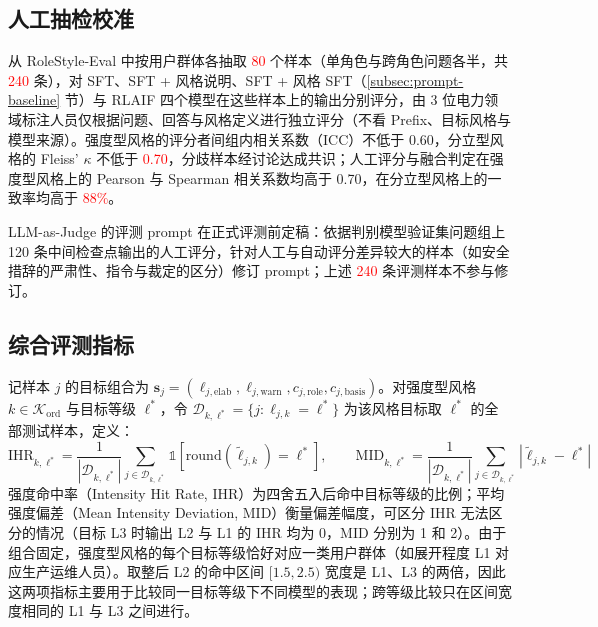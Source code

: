 \documentclass[fontset=fandol,type=master,campus=shenzhen,etitleauto=true]{hithesisbook}
\newcommand{\rev}[1]{\textcolor{red}{#1}}
\begin{document}
\subsection{人工抽检校准}\label{ux4ebaux5de5ux62bdux68c0ux6821ux51c6}

从 RoleStyle-Eval 中按用户群体各抽取 \rev{80} 个样本（单角色与跨角色问题各半，共 \rev{240} 条），对 SFT、SFT + 风格说明、SFT + 风格 SFT（\ref{subsec:prompt-baseline} 节）与 RLAIF 四个模型在这些样本上的输出分别评分，由 3 位电力领域标注人员仅根据问题、回答与风格定义进行独立评分（不看 Prefix、目标风格与模型来源）。强度型风格的评分者间组内相关系数（ICC）\cite{ref76}不低于 0.60，分立型风格的 Fleiss' $\kappa$ 不低于 \rev{0.70}，分歧样本经讨论达成共识；人工评分与融合判定在强度型风格上的 Pearson 与 Spearman 相关系数均高于 0.70，在分立型风格上的一致率均高于 \rev{88\%}。

LLM-as-Judge 的评测 prompt 在正式评测前定稿：依据判别模型验证集问题组上 120 条中间检查点输出的人工评分，针对人工与自动评分差异较大的样本（如安全措辞的严肃性、指令与裁定的区分）修订 prompt；上述 \rev{240} 条评测样本不参与修订。

\subsection{综合评测指标}\label{ux7efcux5408ux8bc4ux6d4bux6307ux6807}

记样本 $j$ 的目标组合为 $\mathbf{s}_j = (\ell_{j,\text{elab}}, \ell_{j,\text{warn}}, c_{j,\text{role}}, c_{j,\text{basis}})$。对强度型风格 $k \in \mathcal{K}_{\text{ord}}$ 与目标等级 $\ell^*$，令 $\mathcal{D}_{k,\ell^*} = \{ j : \ell_{j,k} = \ell^* \}$ 为该风格目标取 $\ell^*$ 的全部测试样本，定义：
\begin{equation}
\text{IHR}_{k,\ell^*} = \frac{1}{|\mathcal{D}_{k,\ell^*}|} \sum_{j \in \mathcal{D}_{k,\ell^*}} \mathbb{1}\!\left[\text{round}(\tilde{\ell}_{j,k}) = \ell^*\right], \qquad
\text{MID}_{k,\ell^*} = \frac{1}{|\mathcal{D}_{k,\ell^*}|} \sum_{j \in \mathcal{D}_{k,\ell^*}} \left|\tilde{\ell}_{j,k} - \ell^*\right|
\end{equation}
强度命中率（Intensity Hit Rate, IHR）为四舍五入后命中目标等级的比例；平均强度偏差（Mean Intensity Deviation, MID）衡量偏差幅度，可区分 IHR 无法区分的情况（目标 L3 时输出 L2 与 L1 的 IHR 均为 0，MID 分别为 1 和 2）。由于组合固定，强度型风格的每个目标等级恰好对应一类用户群体（如展开程度 L1 对应生产运维人员）。取整后 L2 的命中区间 $[1.5, 2.5)$ 宽度是 L1、L3 的两倍，因此这两项指标主要用于比较同一目标等级下不同模型的表现；跨等级比较只在区间宽度相同的 L1 与 L3 之间进行。
\end{document}
